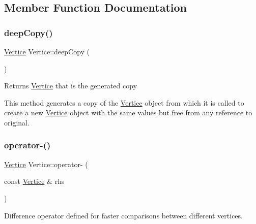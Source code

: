 \subsection{Member Function Documentation}
\mbox{\label{structVertice_a914a6647d86f9f439c1b8751674973ec}} 
\subsubsection{\texorpdfstring{deep\+Copy()}{deepCopy()}}
{\footnotesize\ttfamily \hyperlink{structVertice}{Vertice} Vertice\+::deep\+Copy (\begin{DoxyParamCaption}{ }\end{DoxyParamCaption})\hspace{0.3cm}{\ttfamily [inline]}}

\begin{DoxyReturn}{Returns}
\hyperlink{structVertice}{Vertice} that is the generated copy
\end{DoxyReturn}
This method generates a copy of the \hyperlink{structVertice}{Vertice} object from which it is called to create a new \hyperlink{structVertice}{Vertice} object with the same values but free from any reference to original. \mbox{\label{structVertice_a2f9bd3f865f0613f41bbc2dd3ac2d08d}} 
\subsubsection{\texorpdfstring{operator-\/()}{operator-()}}
{\footnotesize\ttfamily \hyperlink{structVertice}{Vertice} Vertice\+::operator-\/ (\begin{DoxyParamCaption}\item[{const \hyperlink{structVertice}{Vertice} \&}]{rhs }\end{DoxyParamCaption})\hspace{0.3cm}{\ttfamily [inline]}}



Difference operator defined for faster comparisons between different vertices. 

\mbox{\label{structVertice_a8ed5964130f1d72b0a9ab0ce72506e1d}} 
